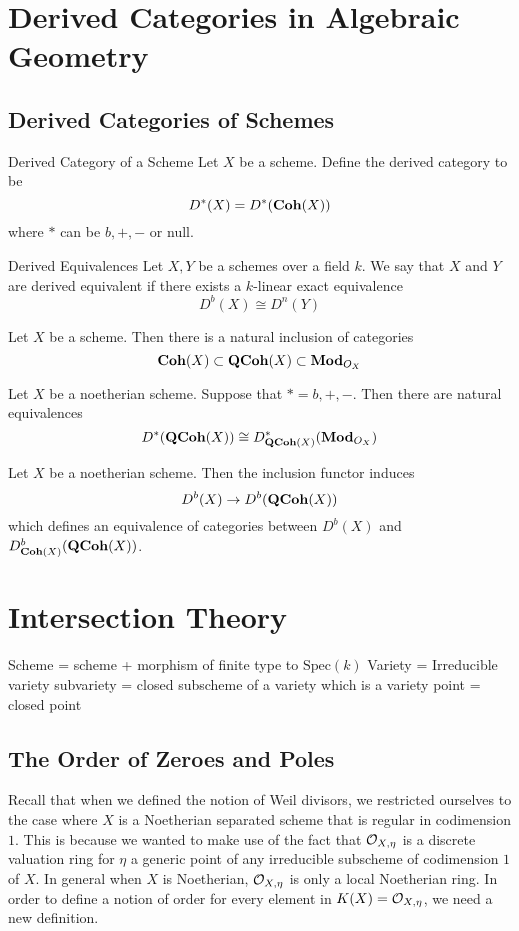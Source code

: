 \documentclass[a4paper]{article}
\begin{document}
\pagebreak
\section{Derived Categories in Algebraic Geometry}
\subsection{Derived Categories of Schemes}
\begin{defn}{Derived Category of a Scheme}{} Let $X$ be a scheme. Define the derived category to be $$D^\ast(X)=D^\ast(\bold{Coh}(X))$$ where $\ast$ can be $b,+,-$ or null. 
\end{defn}

\begin{defn}{Derived Equivalences}{} Let $X,Y$ be a schemes over a field $k$. We say that $X$ and $Y$ are derived equivalent if there exists a $k$-linear exact equivalence $$D^b(X)\cong D^n(Y)$$
\end{defn}

Let $X$ be a scheme. Then there is a natural inclusion of categories $$\bold{Coh}(X)\subset\bold{QCoh}(X)\subset\bold{Mod}_{O_X}$$

\begin{prp}{}{} Let $X$ be a noetherian scheme. Suppose that $\ast=b,+,-$. Then there are natural equivalences $$D^\ast(\bold{QCoh}(X))\cong D_{\bold{QCoh}(X)}^\ast(\bold{Mod}_{O_X})$$
\end{prp}

\begin{prp}{}{} Let $X$ be a noetherian scheme. Then the inclusion functor induces $$D^b(X)\to D^b(\bold{QCoh}(X))$$ which defines an equivalence of categories between $D^b(X)$ and $D_{\bold{Coh}(X)}^b(\bold{QCoh}(X))$. 
\end{prp}

\pagebreak
\section{Intersection Theory}
Scheme = scheme + morphism of finite type to $\text{Spec}(k)$
Variety = Irreducible variety
subvariety = closed subscheme of a variety which is a variety
point = closed point

\subsection{The Order of Zeroes and Poles}
Recall that when we defined the notion of Weil divisors, we restricted ourselves to the case where $X$ is a Noetherian separated scheme that is regular in codimension $1$. This is because we wanted to make use of the fact that $\mathcal{O}_{X,\eta}$ is a discrete valuation ring for $\eta$ a generic point of any irreducible subscheme of codimension $1$ of $X$. In general when $X$ is Noetherian, $\mathcal{O}_{X,\eta}$ is only a local Noetherian ring. In order to define a notion of order for every element in $K(X)=\mathcal{O}_{X,\eta}$, we need a new definition. 
\end{document}
